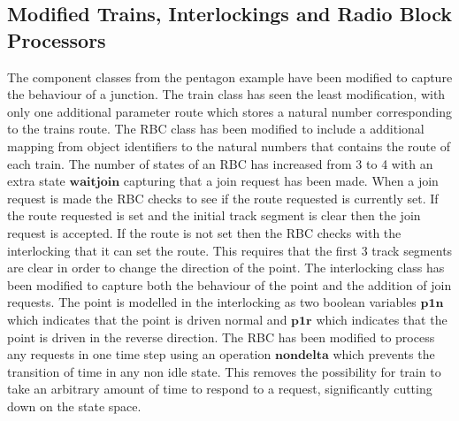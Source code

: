 \subsection*{Modified Trains, Interlockings and Radio Block Processors}
The component classes from the pentagon example have been modified to capture the behaviour of a junction.  The train class has seen the least modification, with only one additional parameter route which stores a natural number corresponding to the trains route. The RBC class has been modified to include a additional mapping from object identifiers to the natural numbers that contains the route of each train. The number of states of an RBC has increased from 3 to 4 with an extra state $\mathbf{waitjoin}$ capturing that a join request has been made. When a join request is made the RBC checks to see if the route requested is currently set. If the route requested is set and the initial track segment is clear then the join request is accepted. If the route is not set then the RBC checks with the interlocking that it can set the route. This requires that the first 3 track segments are clear in order to change the direction of the point. The interlocking class has been modified to capture both the behaviour of the point and the addition of join requests. The point is modelled in the interlocking as two boolean variables $\mathbf{p1n}$ which indicates that the point is driven normal and $\mathbf{p1r}$ which indicates that the point is driven in the reverse direction.
%
The RBC has been modified to process any requests in one time step using an operation $\mathbf{nondelta}$ which prevents the transition of time in any non idle state. This removes the possibility for train to take an arbitrary amount of time to respond to a request, significantly cutting down on the state space.












